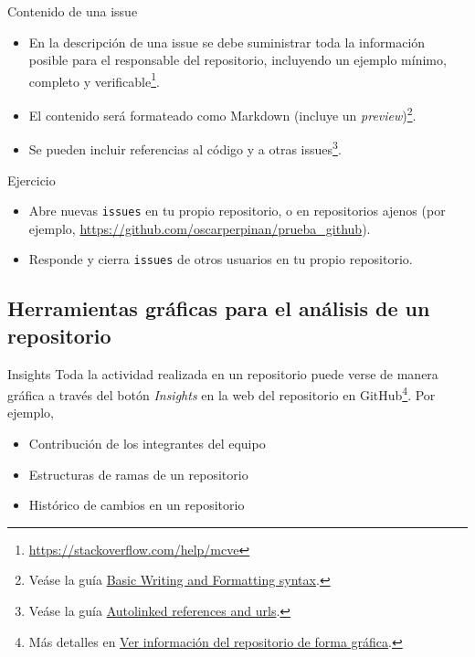 \documentclass[xcolor={usenames,svgnames,dvipsnames}]{beamer}
\begin{document}
\begin{frame}[label={sec:org082b4d1}]{Contenido de una issue}
\begin{itemize}
\item En la descripción de una issue se debe suministrar toda la información posible para el responsable del repositorio, \alert{incluyendo un ejemplo mínimo, completo y verificable}\footnote{\url{https://stackoverflow.com/help/mcve}}.

\item El contenido será formateado como Markdown (incluye un \emph{preview})\footnote{Veáse la guía \href{https://help.github.com/articles/basic-writing-and-formatting-syntax/}{Basic Writing and Formatting syntax}.}.

\item Se pueden incluir referencias al código y a otras issues\footnote{Veáse la guía \href{https://help.github.com/articles/autolinked-references-and-urls/}{Autolinked references and urls}.}.
\end{itemize}
\end{frame}

\begin{frame}[label={sec:orga38279b},fragile]{}
 \begin{block}{Ejercicio}
\begin{itemize}
\item Abre nuevas \texttt{issues} en tu propio repositorio, o en repositorios ajenos (por ejemplo, \url{https://github.com/oscarperpinan/prueba\_github}).

\item Responde y cierra \texttt{issues} de otros usuarios en tu propio repositorio.
\end{itemize}
\end{block}
\end{frame}

\subsection{Herramientas gráficas para el análisis de un repositorio}
\label{sec:org4a68169}

\begin{frame}[label={sec:org9849f73}]{Insights}
Toda la actividad realizada en un repositorio puede verse de manera gráfica a través del botón \emph{Insights} en la web del repositorio en GitHub\footnote{Más detalles en \href{https://help.github.com/categories/visualizing-repository-data-with-graphs/}{Ver información del repositorio de forma gráfica}.}. Por ejemplo,

\begin{itemize}
\item Contribución de los integrantes del equipo
\item Estructuras de ramas de un repositorio
\item Histórico de cambios en un repositorio
\end{itemize}
\end{frame}
\end{document}
